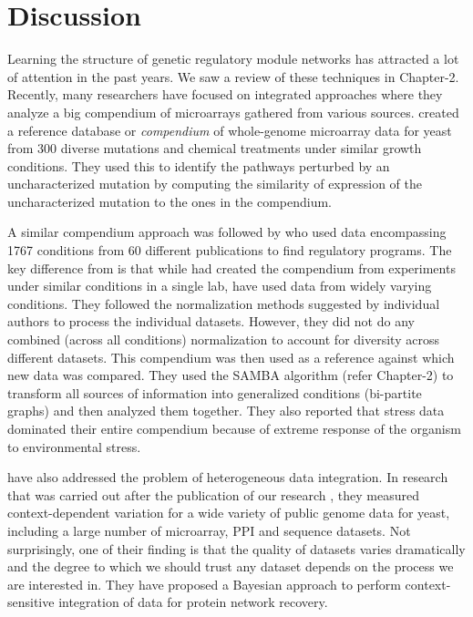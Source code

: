\section{Discussion}
Learning the structure of genetic regulatory module networks has attracted a lot of attention in the past years. We saw a review of these techniques in Chapter-2. Recently, many researchers have focused on integrated approaches where they analyze a big compendium of microarrays gathered from various sources. \citet{hughes00functional} created a reference database or \textit{compendium} of whole-genome microarray data for yeast from 300 diverse mutations and chemical treatments under similar growth conditions. They used this to identify the pathways perturbed by an uncharacterized mutation by computing the similarity of expression of the uncharacterized mutation to the ones in the compendium. 

A similar compendium approach was followed by \citet{amos05integrative} who used data encompassing 1767 conditions from 60 different publications to find regulatory programs. The key difference from \citet{hughes00functional} is that while \citet{hughes00functional} had created the compendium from experiments under similar conditions in a single lab, \citet{amos05integrative} have used data from widely varying conditions. They followed the normalization methods suggested by individual authors to process the individual datasets. However, they did not do any combined (across all conditions) normalization to account for diversity across different datasets. This compendium was then used as a reference against which new data was compared. They used the SAMBA algorithm (refer Chapter-2) to transform all sources of information into generalized conditions (bi-partite graphs) and then analyzed them together. They also reported that stress data dominated their entire compendium because of extreme response of the organism to environmental stress.

\citet{myers2007context} have also addressed the problem of heterogeneous data integration. In research that was carried out after the publication of our research \citep{mishra2007effect}, they measured context-dependent variation for a wide variety of public genome data for yeast, including a large number of microarray, \ac{PPI} and sequence datasets. Not surprisingly, one of their finding is that the quality of datasets varies dramatically and the degree to which we should trust any dataset depends on the process we are interested in. They have proposed a Bayesian approach to perform context-sensitive integration of data for protein network recovery. 

